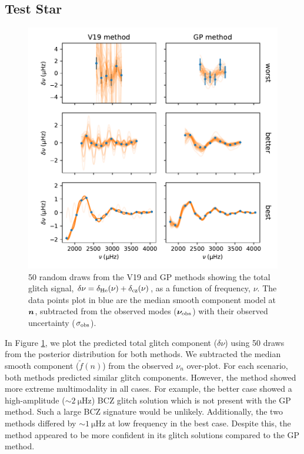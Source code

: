 
\subsection{Test Star}

\begin{figure}[!tb]
    \centering
    \includegraphics{figures/glitch-test-signal.pdf}
    \caption[50 random draws from the V19 and GP results showing the total glitch signal as a function of frequency.]{50 random draws from the V19 and GP methods showing the total glitch signal, \(\delta\nu = \delta_{{\mathrm{He}}}(\nu) + \delta_{{\mathrm{cz}}}(\nu)\), as a function of frequency, \(\nu\). The data points plot in blue are the median smooth component model at \(\bm{n}\), subtracted from the observed modes (\(\bm{\nu}_{{\mathrm{obs}}}\)) with their observed uncertainty (\(\sigma_{{\mathrm{obs}}}\)).}
    \label{fig:glitch-test-signal}
\end{figure}

In Figure \ref{fig:glitch-test-signal}, we plot the predicted total glitch component (\(\delta\nu\)) using 50 draws from the posterior distribution for both methods. We subtracted the median smooth component (\(\tilde{f}(n)\)) from the observed \(\nu_n\) over-plot. For each scenario, both methods predicted similar glitch components. However, the  method showed more extreme multimodality in all cases. For example, the better case showed a high-amplitude (\(\sim \SI{2}{\micro\hertz}\)) BCZ glitch solution which is not present with the GP method. Such a large BCZ signature would be unlikely. Additionally, the two methods differed by \(\sim \SI{1}{\micro\hertz}\) at low frequency in the best case. Despite this, the  method appeared to be more confident in its glitch solutions compared to the GP method.

